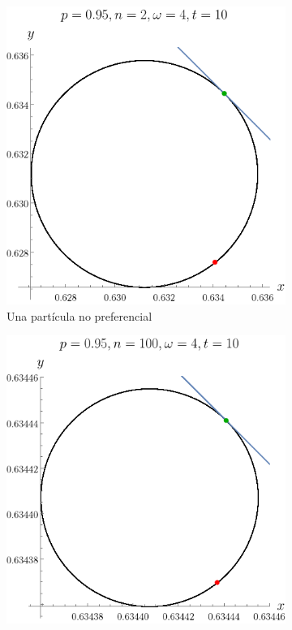 \begin{figure}[ht!]
    \centering
    \begin{subfigure}{0.5\textwidth}
      \centering
      \includegraphics[width=0.9\linewidth]{chapter3/figures_separable/local_Z_evol_n=2_p=0.95_from_-10_to_10_end=10.png}
      \caption{Una partícula no preferencial}
    \end{subfigure}%
    \begin{subfigure}{0.5\textwidth}
      \centering
      \includegraphics[width=0.9\linewidth]{chapter3/figures_separable/local_Z_evol_n=100_p=0.95_from_-10_to_10_end=10.png}

\end{subfigure}
\end{figure}
